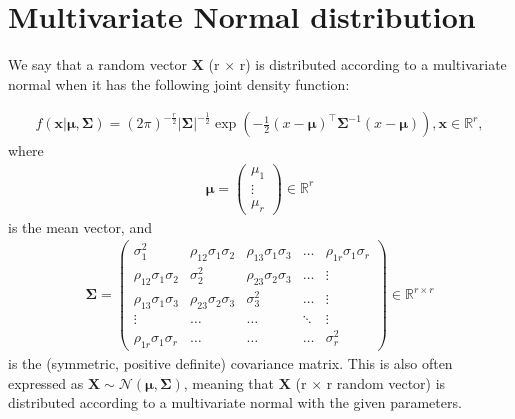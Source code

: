 \section{Multivariate Normal distribution}\label{sec:multnormaldist}

We say that a random vector $\bm{X}$ (r $\times$ r) is distributed according to a multivariate normal when it has the following joint density function\autocite[p. 59]{izenman_modern_2008}:
\begin{definition}
    \begin{align}
        f(\bm{x}| \bm{\mu}, \bm{\Sigma}) = (2\pi)^{-\frac{r}{2}} \left|\bm{\Sigma}\right|^{-\frac{1}{2}} \exp\left(-\frac{1}{2}(x-\bm{\mu})^\top \bm{\Sigma}^{-1} (x-\bm{\mu})\right),
        \bm{x} \in \mathbb{R}^r,
    \end{align}
    where
    \begin{align}
        \bm{\mu} =
        \begin{pmatrix}
            \mu_1  \\
            \vdots \\
            \mu_r
        \end{pmatrix}
        \in \mathbb{R}^r
    \end{align}
    is the mean vector, and
    \begin{align*}
        \bm{\Sigma} =
        \begin{pmatrix}
            \sigma_1^2                & \rho_{12}\sigma_1\sigma_2 & \rho_{13}\sigma_1\sigma_3 & \ldots & \rho_{1r}\sigma_1\sigma_r \\
            \rho_{12}\sigma_1\sigma_2 & \sigma_2^2                & \rho_{23}\sigma_2\sigma_3 & \ldots & \vdots                    \\
            \rho_{13}\sigma_1\sigma_3 & \rho_{23}\sigma_2\sigma_3 & \sigma_3^2                & \ldots & \vdots                    \\
            \vdots                    & \ldots                    & \ldots                    & \ddots & \vdots                    \\
            \rho_{1r}\sigma_1\sigma_r & \ldots                    & \ldots                    & \ldots & \sigma_r^2
        \end{pmatrix}
        \in \mathbb{R}^{r\times r}
    \end{align*}
    is the (symmetric, positive definite) covariance matrix.
    This is also often expressed as $\bm{X} \sim \mathcal{N}(\bm{\mu}, \bm{\Sigma})$, meaning that $\bm{X}$ (r $\times$ r random vector) is distributed according to a multivariate normal with the given parameters.
\end{definition}






 
